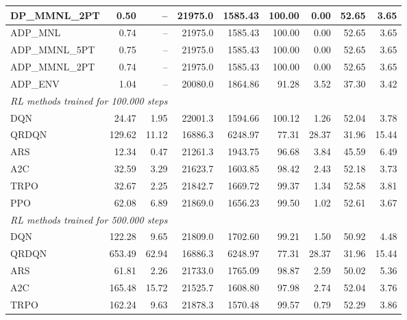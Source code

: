 \begin{samepage}
\begin{center}
\begin{tabular}{l|rr|rr|rr|rr}
    DP\_MMNL\_2PT &     0.50 &    -- &    21975.0 &    1585.43 &  100.00 &    0.00 &   52.65 &    3.65 \\
    \midrule
    ADP\_MNL     &     0.74 &    -- &    21975.0 &    1585.43 &  100.00 &    0.00 &   52.65 &    3.65 \\
    ADP\_MMNL\_5PT &     0.75 &    -- &    21975.0 &    1585.43 &  100.00 &    0.00 &   52.65 &    3.65 \\
    ADP\_MMNL\_2PT &     0.74 &    -- &    21975.0 &    1585.43 &  100.00 &    0.00 &   52.65 &    3.65 \\
    ADP\_ENV     &     1.04 &    -- &    20080.0 &    1864.86 &   91.28 &    3.52 &   37.30 &    3.42 \\
    \midrule
    \multicolumn{9}{l}{\textit{RL methods trained for 100.000 steps}} \\
    \midrule
    DQN          &    24.47 &     1.95 &    22001.3 &    1594.66 &  100.12 &    1.26 &   52.04 &    3.78 \\
    QRDQN        &   129.62 &    11.12 &    16886.3 &    6248.97 &   77.31 &   28.37 &   31.96 &   15.44 \\
    ARS          &    12.34 &     0.47 &    21261.3 &    1943.75 &   96.68 &    3.84 &   45.59 &    6.49 \\
    A2C          &    32.59 &     3.29 &    21623.7 &    1603.85 &   98.42 &    2.43 &   52.18 &    3.73 \\
    TRPO         &    32.67 &     2.25 &    21842.7 &    1669.72 &   99.37 &    1.34 &   52.58 &    3.81 \\
    PPO          &    62.08 &     6.89 &    21869.0 &    1656.23 &   99.50 &    1.02 &   52.61 &    3.67 \\
    \midrule
    \multicolumn{9}{l}{\textit{RL methods trained for 500.000 steps}} \\
    \midrule
    DQN          &   122.28 &     9.65 &    21809.0 &    1702.60 &   99.21 &    1.50 &   50.92 &    4.48 \\
    QRDQN        &   653.49 &    62.94 &    16886.3 &    6248.97 &   77.31 &   28.37 &   31.96 &   15.44 \\
    ARS          &    61.81 &     2.26 &    21733.0 &    1765.09 &   98.87 &    2.59 &   50.02 &    5.36 \\
    A2C          &   165.48 &    15.72 &    21525.7 &    1608.80 &   97.98 &    2.74 &   52.04 &    3.76 \\
    TRPO         &   162.24 &     9.63 &    21878.3 &    1570.48 &   99.57 &    0.79 &   52.29 &    3.86 \\

\end{tabular}
\end{center}
\end{samepage}
